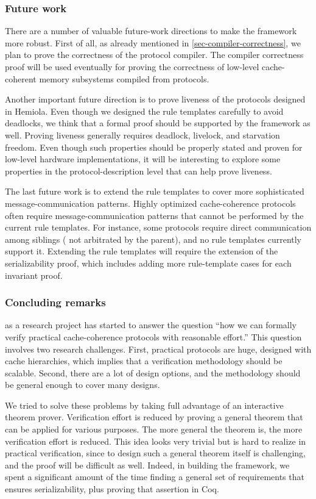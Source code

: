 \subsubsection{Future work}

There are a number of valuable future-work directions to make the \hemiola{} framework more robust.
First of all, as already mentioned in \autoref{sec-compiler-correctness}, we plan to prove the correctness of the protocol compiler.
The compiler correctness proof will be used eventually for proving the correctness of low-level cache-coherent memory subsystems compiled from \hemiola{} protocols.

Another important future direction is to prove liveness of the protocols designed in Hemiola.
Even though we designed the rule templates carefully to avoid deadlocks, we think that a formal proof should be supported by the framework as well.
Proving liveness generally requires deadlock, livelock, and starvation freedom.
Even though such properties should be properly stated and proven for low-level hardware implementations, it will be interesting to explore some properties in the protocol-description level that can help prove liveness.

The last future work is to extend the rule templates to cover more sophisticated message-communication patterns.
Highly optimized cache-coherence protocols often require message-communication patterns that cannot be performed by the current rule templates.
For instance, some protocols require direct communication among siblings (\ie{} not arbitrated by the parent), and no rule templates currently support it.
Extending the rule templates will require the extension of the serializability proof, which includes adding more rule-template cases for each invariant proof.

\subsubsection{Concluding remarks}

\hemiola{} as a research project has started to answer the question ``how we can formally verify practical cache-coherence protocols with reasonable effort.''
This question involves two research challenges.
First, practical protocols are huge, designed with cache hierarchies, which implies that a verification methodology should be scalable.
Second, there are a lot of design options, and the methodology should be general enough to cover many designs.

We tried to solve these problems by taking full advantage of an interactive theorem prover.
Verification effort is reduced by proving a general theorem that can be applied for various purposes.
The more general the theorem is, the more verification effort is reduced.
This idea looks very trivial but is hard to realize in practical verification, since to design such a general theorem itself is challenging, and the proof will be difficult as well.
Indeed, in building the \hemiola{} framework, we spent a significant amount of the time finding a general set of requirements that ensures serializability, plus proving that assertion in Coq.


